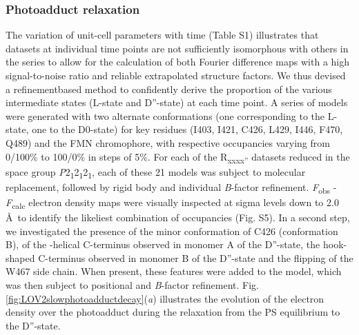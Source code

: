 \subsubsection{Photoadduct relaxation}
The variation of unit-cell parameters with time (Table S1) illustrates that datasets at individual time points are not sufficiently isomorphous with others in the series to allow for the calculation of both Fourier difference maps with a high signal-to-noise ratio and reliable extrapolated structure factors. We thus devised a refinementbased method to confidently derive the proportion of the various intermediate states (L-state and D''-state) at each time point. A series of models were generated with two alternate conformations (one corresponding to the L-state, one to the D0-state) for key residues (I403, I421, C426, L429, I446, F470, Q489) and the FMN chromophore, with respective occupancies varying from 0/100\% to 100/0\% in steps of 5\%. For each of the R\textsubscript{xxxx''} datasets reduced in the space group \textit{P}2\textsubscript{1}2\textsubscript{1}2\textsubscript{1}, each of these 21 models was subject to molecular replacement, followed by rigid body and individual \textit{B}-factor refinement. \textit{F}\textsubscript{obs} - \textit{F}\textsubscript{calc} electron density maps were visually inspected at sigma levels down to 2.0 \AA\ to identify the likeliest combination of occupancies (Fig. S5). In a second step, we investigated the presence of the minor conformation of C426 (conformation B), of the \textalpha-helical C-terminus observed in monomer A of the D''-state, the hook-shaped C-terminus observed in monomer B of the D''-state and the flipping of the W467 side chain. When present, these features were added to the model, which was then subject to positional and \textit{B}-factor refinement. Fig. \ref{fig:LOV2slowphotoadductdecay}(\textit{a}) illustrates the evolution of the electron density over the photoadduct during the relaxation from the PS equilibrium to the D''-state.

